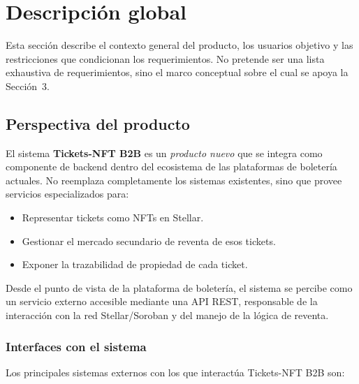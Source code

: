 \documentclass[12pt,letterpaper]{article}
\begin{document}
\section{Descripción global}

Esta sección describe el contexto general del producto, los usuarios
objetivo y las restricciones que condicionan los requerimientos. No pretende
ser una lista exhaustiva de requerimientos, sino el marco conceptual sobre el
cual se apoya la Sección~3.

\subsection{Perspectiva del producto}

El sistema \textbf{Tickets-NFT B2B} es un \textit{producto nuevo} que se
integra como componente de backend dentro del ecosistema de las plataformas de
boletería actuales. No reemplaza completamente los sistemas existentes, sino
que provee servicios especializados para:

\begin{itemize}
    \item Representar tickets como NFTs en Stellar.
    \item Gestionar el mercado secundario de reventa de esos tickets.
    \item Exponer la trazabilidad de propiedad de cada ticket.
\end{itemize}

Desde el punto de vista de la plataforma de boletería, el sistema se percibe
como un servicio externo accesible mediante una API REST, responsable de la
interacción con la red Stellar/Soroban y del manejo de la lógica de reventa.

\subsubsection{Interfaces con el sistema}

Los principales sistemas externos con los que interactúa Tickets-NFT B2B son:
\end{document}
